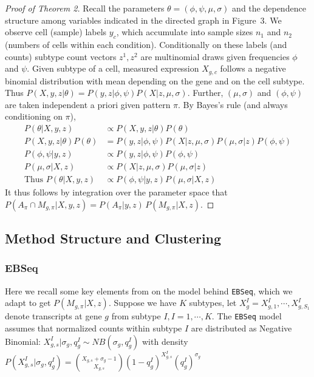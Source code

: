 \documentclass[aoas,preprint]{imsart}
\begin{document}
\begin{proof}[Proof of Theorem 2]
Recall the parameters $\theta = (\phi, \psi, \mu, \sigma)$ and
the dependence structure among variables indicated in the directed  graph in Figure~3. 
We observe cell (sample) labels $y_c$, which accumulate into sample sizes $n_1$ and $n_2$
 (numbers of cells within each condition).  Conditionally on these labels (and counts)
 subtype count vectors $z^1, z^2$ are multinomial draws given frequencies $\phi$ and $\psi$.
Given subtype of a cell, measured expression  $X_{g,c}$ follows   a  negative binomial distribution 
with mean depending on the gene and on the cell subtype.
Thus $P(X,y,z | \theta) = P(y, z | \phi,\psi ) P(X | z, \mu, \sigma)$. 
Further, $(\mu,\sigma)$ and $(\phi, \psi)$ are taken independent a priori given pattern $\pi$.
By Bayes's rule (and always conditioning on $\pi$), 
\begin{align*}
P(\theta | X,y,z) &\propto P(X,y,z | \theta) P(\theta) \\
P(X,y,z | \theta) P(\theta)  &=  P(y, z | \phi,\psi ) P(X | z, \mu, \sigma) P(\mu,\sigma | z) P(\phi, \psi)\\
P(\phi,\psi | y, z) &\propto P(y, z | \phi,\psi )P(\phi, \psi)\\
P(\mu, \sigma | X, z) &\propto P(X | z, \mu, \sigma) P(\mu,\sigma | z)\\
\text{Thus }
P(\theta | X,y,z) &\propto P(\phi,\psi | y, z) P(\mu, \sigma | X, z)
\end{align*}
It thus follows by integration over the parameter space that
$ P\left(A_\pi \cap M_{g,\pi} |X,y,z \right) =  P\left(A_\pi |y,z \right) \, 
                      P\left(M_{g,\pi}| X,z \right).  $
\end{proof}


\subsection{Method Structure and Clustering}

\subsubsection*{EBSeq}
Here we recall some key elements from \cite{ref:Leng} on the model behind \texttt{EBSeq},
which we adapt to get $P(M_{g,\pi} | X, z)$.  Suppose we have $K$ subtypes, let $X_g^I = X_{g, 1}^I, \cdots , X_{g, S_1}^I$ 
denote transcripts at gene $g$ from subtype $I, I = 1, \cdots, K$.  The \texttt{EBSeq} model assumes that normalized counts within subtype $I$ are distributed as Negative Binomial:
$X_{g, s}^I | \sigma_g, q_g^I \sim NB(\sigma_{g}, q_g^I)$ with density  $P(X_{g,s}^I | \sigma_g, q_g^I ) = {X_{g,s} + \sigma_g - 1 \choose X_{g,s} }(1 - q_g^I)^{X_{g,s}^I} (q_g^I)^{\sigma_g}$
\end{document}

